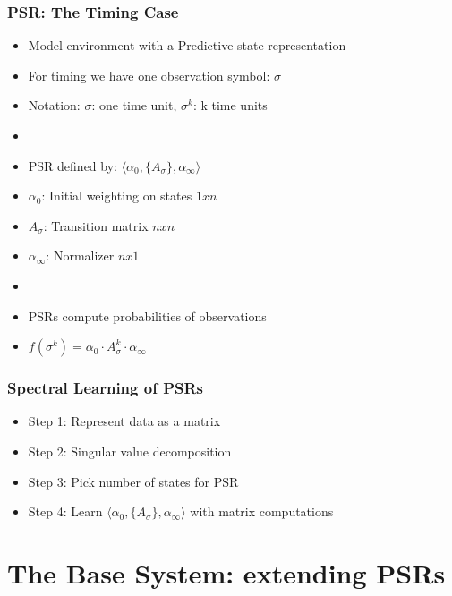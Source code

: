 \documentclass{beamer}
\begin{document}
\begin{frame}
\frametitle{PSR: The Timing Case}

\begin{itemize}
\item Model environment with a Predictive state representation
\item For timing we have one observation symbol: {$\sigma$}
\item[] Notation: $\sigma$: one time unit, $\sigma^k$: k time units
\item[]
\item PSR defined by: $\langle \alpha_0, \{A_\sigma\},\alpha_\infty \rangle$
\item[] $\alpha_0$: Initial weighting on states $1xn$
\item[] $A_\sigma$: Transition matrix $nxn$
\item[] $\alpha_\infty$: Normalizer $nx1$
\item[]
\item PSRs compute probabilities of observations

\item[] $f(\sigma^k) = \alpha_0 \cdot A_\sigma^k \cdot \alpha_\infty$
 
\end{itemize}

\end{frame}


\begin{frame}
\frametitle{Spectral Learning of PSRs}

\begin{itemize}
\item[] Step 1: Represent data as a matrix
\item[] Step 2: Singular value decomposition
\item[] Step 3: Pick number of states for PSR
\item[] Step 4: Learn $\langle \alpha_0, \{A_\sigma\},\alpha_\infty \rangle$ with matrix computations
\end{itemize}

\end{frame}

\section{The Base System: extending PSRs}
\end{document}
